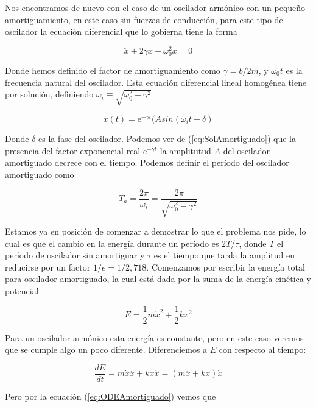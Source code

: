 \documentclass[a4paper,10pt]{article}
\newcommand{\euler}{\mathrm{e}}
\begin{document}
Nos encontramos de nuevo con el caso de un oscilador armónico con un pequeño amortiguamiento,
en este caso sin fuerzas de conducción, para este tipo de oscilador la ecuación diferencial
que lo gobierna tiene la forma 

\begin{equation}
 \ddot{x} + 2 \gamma \dot{x} + \omega_0^2 x = 0 
 \label{eq:ODEAmortiguado}
\end{equation}

Donde hemos definido el factor de amortiguamiento como $\gamma = b/2m$, y $\omega_0t$ 
es la frecuencia natural del oscilador. Esta ecuación diferencial lineal homogénea tiene
por solución, definiendo $\omega_i \equiv \sqrt{\omega_0^2 - \gamma^2}$

\begin{equation}
 x(t) = \euler^{-\gamma t} (A sin(\omega_i t + \delta)
 \label{eq:SolAmortiguado}
\end{equation}

Donde $\delta$ es la fase del oscilador. Podemos ver de (\ref{eq:SolAmortiguado}) que
la presencia del factor exponencial real $\euler^{-\gamma t}$ la amplitutud $A$ 
del oscilador amortiguado decrece con el tiempo. Podemos definir el período del oscilador
amortiguado como

\begin{equation}
 T_a = \frac{2\pi}{\omega_i} = \frac{2\pi}{\sqrt{\omega_0^2-\gamma^2}}
 \label{eq:PeriodoAmortiguado1}
\end{equation}

Estamos ya en posición de comenzar a demostrar lo que el problema nos pide, lo cual es
que el cambio en la energía durante un período es $2T/\tau$,
donde $T$ el período de oscilador sin amortiguar y $\tau$ es el tiempo
que tarda la amplitud en reducirse por un factor $1/e=1/2,718$. Comenzamos por 
escribir la energía total para oscilador amortiguado, la cual está dada por la suma
de la energía cinética y potencial

\begin{equation}
 E = \frac{1}{2} m \dot{x}^2 + \frac{1}{2} kx^2
 \label{eq:EnergiaAmorti1}
\end{equation}

Para un oscilador armónico esta energía es constante, pero en este caso veremos
que se cumple algo un poco diferente. Diferenciemos a $E$ con respecto al tiempo:

$$
\frac{dE}{dt} = m\dot{x}\ddot{x} + kx\dot{x} = (m\ddot{x}+kx)\dot{x}
$$

Pero por la ecuación (\ref{eq:ODEAmortiguado}) vemos que
\end{document}
